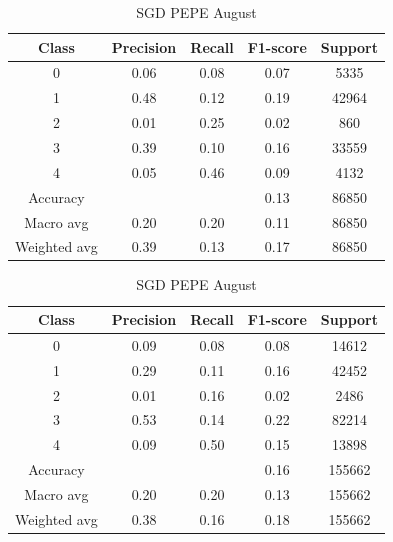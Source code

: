 \begin{enumerate}
        \begin{table}[H]
        \centering
        \scriptsize
        \begin{minipage}{0.48\textwidth}
        \centering
        \begin{tabular}{c|cccc}
        \hline
        Class & Precision & Recall & F1-score & Support \\
        \hline
        0 & 0.06 & 0.08 & 0.07 & 5335 \\
        1 & 0.48 & 0.12 & 0.19 & 42964 \\
        2 & 0.01 & 0.25 & 0.02 & 860 \\
        3 & 0.39 & 0.10 & 0.16 & 33559 \\
        4 & 0.05 & 0.46 & 0.09 & 4132 \\
        \hline
        Accuracy &       &      & 0.13 & 86850 \\
        Macro avg & 0.20 & 0.20 & 0.11 & 86850 \\
        Weighted avg & 0.39 & 0.13 & 0.17 & 86850 \\
        \hline
        \end{tabular}
        \caption{SGD DOGE August}
        \label{tab:classifier_1_report_sgd_doge_filtered_aug}
        \end{minipage}
        \hfill
        \begin{minipage}{0.48\textwidth}
        \centering
        \begin{tabular}{c|cccc}
        \hline
        Class & Precision & Recall & F1-score & Support \\
        \hline
        0 & 0.09 & 0.08 & 0.08 & 14612 \\
        1 & 0.29 & 0.11 & 0.16 & 42452 \\
        2 & 0.01 & 0.16 & 0.02 & 2486 \\
        3 & 0.53 & 0.14 & 0.22 & 82214 \\
        4 & 0.09 & 0.50 & 0.15 & 13898 \\
        \hline
        Accuracy &       &      & 0.16 & 155662 \\
        Macro avg & 0.20 & 0.20 & 0.13 & 155662 \\
        Weighted avg & 0.38 & 0.16 & 0.18 & 155662 \\
        \hline
        \end{tabular}
        \caption{SGD PEPE August}
        \label{tab:classifier_1_report_sgd_pepe_filtered_aug}
        \end{minipage}
        

\end{table}
\end{enumerate}
